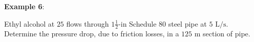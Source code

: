 \documentclass[10pt]{amsart}
\begin{document}
	\begin{multicols}{2}
	
	\textbf{Example 6}:
	
	Ethyl alcohol at $25$\textcelsius{} flows through $1\tfrac{1}{2}\text{-in}$ Schedule $80$ steel pipe at
	$5\text{ L/s}$. Determine the pressure drop, due to friction losses, in a $125\text{ m}$ section of pipe.

% 	


\end{multicols}
\end{document}
